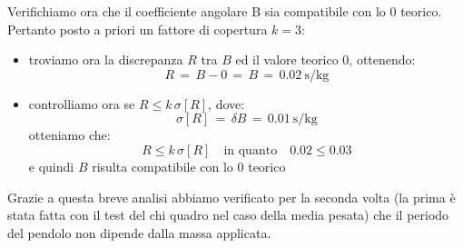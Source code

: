 Verifichiamo ora che il coefficiente angolare B sia compatibile con lo 0 teorico.
Pertanto posto a priori un fattore di copertura $k = 3$:

\begin{itemize}
			
	\item{troviamo ora la discrepanza $R$ tra $B$ ed il valore teorico 0, ottenendo:
			\begin{equation*}
				R \,=\, B - 0 \,=\, B \,=\, \SI{0.02}{\second\per\kilo\gram}
			\end{equation*}
			}
	\item{controlliamo ora se $R \leq k\,\sigma[R]$, dove:
			\begin{equation*}
				\sigma[R] \,=\, \delta B \,=\, \SI{0.01}{\second\per\kilo\gram}	
			\end{equation*}
			otteniamo che:
			\begin{equation*}
				R \leq k\,\sigma[R] \quad \text{in quanto} \quad 0.02 \leq 0.03
			\end{equation*}
			e quindi $B$ risulta compatibile con lo 0 teorico}			
\end{itemize}
Grazie a questa breve analisi abbiamo verificato per la seconda volta (la prima è stata fatta con il test del chi quadro nel caso della media
pesata) che il periodo del pendolo non dipende dalla massa applicata.

